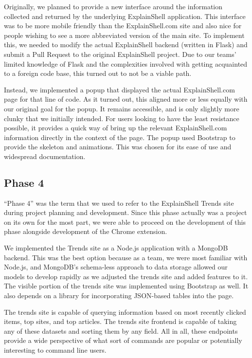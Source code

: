 \documentclass[11pt]{article}
\begin{document}
Originally, we planned to provide a new interface around the information
collected and returned by the underlying ExplainShell application.  This
interface was to be more mobile friendly than the ExplainShell.com site and
also nice for people wishing to see a more abbreviated version of the main
site. To implement this, we needed to modify the actual ExplainShell backend
(written in Flask) and submit a Pull Request to the original ExplainShell
project. Due to our teams' limited knowledge of Flask and the complexities
involved with getting acquainted to a foreign code base, this turned out to not
be a viable path.

Instead, we implemented a popup that displayed the actual ExplainShell.com page
for that line of code. As it turned out, this aligned more or less equally with
our original goal for the popup. It remains accessible, and is only slightly
more clunky that we initially intended. For users looking to have the least
resistance possible, it provides a quick way of bring up the relevant
ExplainShell.com information directly in the context of the page. The popup
used Bootstrap to provide the skeleton and animations. This was chosen
for its ease of use and widespread documentation.

\subsection{Phase 4}

``Phase 4'' was the term that we used to refer to the ExplainShell Trends site
during project planning and development. Since this phase actually was a project
on its own for the most part, we were able to proceed on the development of this
phase alongside development of the Chrome extension.

We implemented the Trends site as a Node.js application with a MongoDB backend.
This was the best option because as a team, we were most familiar with Node.js,
and MongoDB's schema-less approach to data storage allowed our models to develop
rapidly as we adjusted the trends site and added features to it. The visible
portion of the trends site was implemented using Bootstrap as well. It also
depends on a library for incorporating JSON-based tables into the page.

The trends site is capable of querying information based on most recently
clicked items, top sites, and top articles. The trends site frontend is capable
of taking any of these datasets and sorting them by any field. All in all,
these endpoints provide a wide perspective of what sort of commands are popular
or potentially interesting to command line users.
\end{document}
